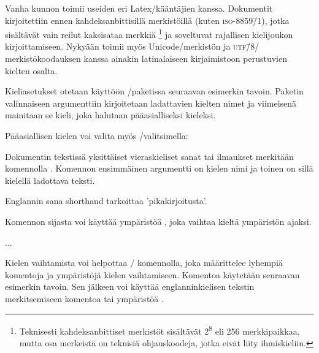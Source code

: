 Vanha kunnon  toimii useiden eri Latex\-/kääntäjien
kanssa. Dokumentit kirjoitettiin ennen kahdeksanbittisillä merkistöillä
(kuten \textsc{iso-8859\=/1}), jotka sisältävät vain reilut kaksisataa
merkkiä%
\footnote{Teknisesti kahdeksanbittiset merkistöt sisältävät
  2\textsuperscript8 eli 256 merkkipaikkaa, mutta osa merkeistä on
  teknisiä ohjauskoodeja, jotka eivät liity ihmiskieliin.} %
ja soveltuvat rajallisen kielijoukon kirjoittamiseen. Nykyään
 toimii myös Unicode\-/merkistön ja \textsc{utf\=/8}\-/
merkistökoodauksen kanssa ainakin latinalaiseen kirjaimistoon
perustuvien kielten osalta.

Kieliasetukset otetaan käyttöön \-/paketissa seuraavan
esimerkin tavoin. Paketin valinnaiseen argumenttiin kirjoitetaan
ladattavien kielten nimet ja viimeisenä mainitaan se kieli, joka
halutaan pääasialliseksi kieleksi.

\begin{koodilohkosis}
\usepackage[english,greek,finnish]{babel}
\end{koodilohkosis}

Pääasiallisen kielen voi valita myös \-/valitsimella:

\begin{koodilohkosis}
\usepackage[main=finnish,english,greek]{babel}
\end{koodilohkosis}

Dokumentin tekstissä yksittäiset vieraskieliset sanat tai ilmaukset
merkitään komennolla . Komennon ensimmäinen
argumentti on kielen nimi ja toinen on sillä kielellä ladottava teksti.

\begin{koodilohkosis}
Englannin sana \foreignlanguage{english}{shorthand} tarkoittaa
'pikakirjoitusta'.
\end{koodilohkosis}

Komennon sijasta voi käyttää ympäristöä , joka
vaihtaa kieltä ympäristön ajaksi.

\begin{koodilohkosis}
\begin{otherlanguage}{greek}
  ...
\end{otherlanguage}
\end{koodilohkosis}

Kielen vaihtamista voi helpottaa \-/ komennolla, joka
määrittelee lyhempiä komentoja ja ympäristöjä kielen vaihtamiseen.
Komentoa käytetään seuraavan esimerkin tavoin. Sen jälkeen voi käyttää
englanninkielisen tekstin merkitsemiseen komentoa 
tai ympäristöä .

